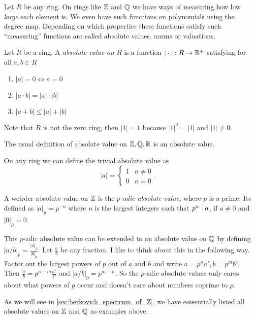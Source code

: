 Let $R$ be any ring. On rings like $\mathbb{Z}$ and $\mathbb{Q}$ we have ways of measuring how low \emph{large} each element is. We even have such functions on polynomials using the degree map. Depending on which properties these functions satisfy such ``measuring'' functions are called absolute values, norms or valuations. 
\begin{definition}
	Let $R$ be a ring. A \emph{absolute value on $R$} is a function $|\cdot |: R \to \mathbb{R}^{+}$ satisfying for all $a, b \in R$
	\begin{enumerate}
		\item $|a| = 0 \iff a = 0$ 
		\item $|a \cdot b| = |a| \cdot |b|$ 
		\item $|a + b| \le |a| + |b|$
	\end{enumerate}
\end{definition}
Note that $R$ is not the zero ring, then $|1| = 1$ because $|1|^2 = |1| $ and $|1|\ne 0 $. 
\begin{example}
	The usual definition of absolute value on $\mathbb{Z}, \mathbb{Q}, \mathbb{R}$ is an absolute value. 
\end{example}
\begin{example}
	On any ring we can define the trivial absolute value as \[
	 |a| = \begin{cases}
		 1 & a \ne 0 \\
		 0 & a = 0
	 \end{cases}
	.\] 
\end{example}
\begin{example}
	A weirder absolute value on $\mathbb{Z}$ is the \emph{$p$-adic absolute value}, where $p$ is a prime. 
	Its defined as $|a|_p = p^{-n}$ where $n$ is the largest integers such that $p^{n} \mid a$, if $a \ne 0$ and $|0|_p = 0$. 


	This $p$-adic absolute value can be extended to an absolute value on $\mathbb{Q}$ by defining $|a / b|_p = \frac{|a|_p}{|b|_p}$. Let $\frac{a}{b}$ be any fraction. 
	I like to think about this in the following way. 
	Factor out the largest powers of $p$ out of $a$ and $b$ and write $a = p^{n} a', b = p^{m} b'$. Then $\frac{a}{ b} = p^{n - m} \frac{a'}{ b'}$ and $|a / b|_p = p^{m - n}$. 
	So the $p$-adic absolute values only cares about what powers of $p$ occur and doesn't care about numbers coprime to $p $.
\end{example}
As we will see in \cref{sec:berkovich_spectrum_of_Z}, we have esssentially listed all absolute values on $\mathbb{Z}$ and $\mathbb{Q}$ as examples above.  


